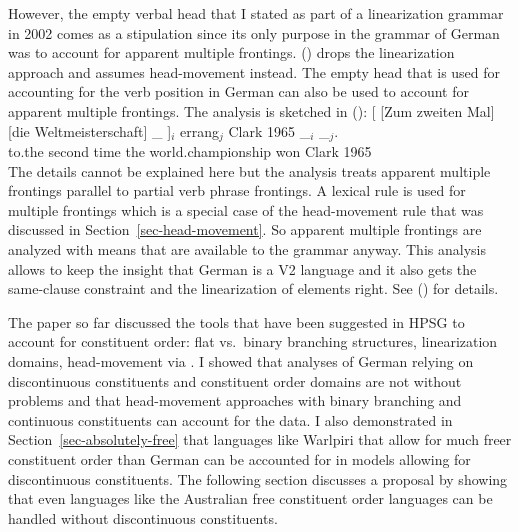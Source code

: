 \documentclass[output=paper]{langsci/langscibook}
\begin{document}
However, the empty verbal head that I stated as part of a linearization grammar in 2002 comes as a stipulation since its
only purpose in the grammar of German was to account for apparent multiple
frontings.
\citeauthor{Mueller2005d} (\citeyear*{Mueller2005c,MuellerGS})
drops the linearization approach and assumes head-movement
instead. The empty head that is used for accounting for the verb position in German can also be used
to account for apparent multiple frontings. The analysis is sketched in ():
\ea
\label{ex-zum-zweiten-anal-zwei}%
\gll {}[ [Zum zweiten Mal] [die Weltmeisterschaft] \_ ]$_i$ errang$_j$ Clark 1965 \_$_i$ \_$_j$.\\
      {}         \spacebr{}to.the second time \spacebr{}the world.championship {} {} won Clark 1965\\
\z 
The details cannot be explained here but the analysis treats apparent multiple frontings parallel to
partial verb phrase frontings. A lexical rule is used for multiple frontings which is a special case
of the head-movement rule that was discussed in Section~\ref{sec-head-movement}. So apparent
multiple frontings are analyzed with means that are available to the grammar anyway. This analysis
allows to keep the insight that German is a V2 language and it also gets the same-clause constraint
and the linearization of elements right. See
\citeauthor{Mueller2005c} (\citeyear*{Mueller2005c,Mueller2005d,MuellerGS})
for details.




The paper so far discussed the tools that have been suggested in HPSG to account for constituent
order: flat vs.\ binary branching structures, linearization domains, head-movement via \dsl. I
showed that analyses of German relying on discontinuous constituents and constituent order domains
are not without problems and that head-movement approaches with binary branching and continuous
constituents can account for the data. I also demonstrated in Section~\ref{sec-absolutely-free} that
languages like Warlpiri that allow for much freer constituent order than German can be accounted
for in models allowing for discontinuous constituents. The following section discusses a proposal by \citet{Bender2008a} showing that even
languages like the Australian free constituent order languages can be handled without discontinuous constituents.
\end{document}
